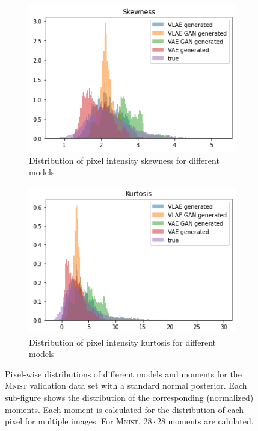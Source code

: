 \begin{figure}
    \hfill
    \begin{subfigure}{0.48\textwidth}
        \centering
        \includegraphics[width=\textwidth]{images/generated_vs_true/mnist/mnist_vs_models_skew_gauss_post.png}
        \caption{Distribution of pixel intensity skewness for different models}
        \label{subfig:skew_generated_vs_true_gauss_post}
    \end{subfigure}
    \hfill
    \begin{subfigure}{0.48\textwidth}
        \centering
        \includegraphics[width=\textwidth]{images/generated_vs_true/mnist/mnist_vs_models_kurt_gauss_post.png}
        \caption{Distribution of pixel intensity kurtosis for different models}
        \label{subfig:kurt_generated_vs_true_gauss_post}
    \end{subfigure}
    \caption[Models on \textsc{Mnist}: Pixel-wise distributions - Gaussian Posterior]{Pixel-wise distributions of different models and moments for the \textsc{Mnist} validation data set with a standard normal posterior.
    Each sub-figure shows the distribution of the corresponding (normalized) moments. Each moment is calculated for the distribution of each pixel for multiple images.
    For \textsc{Mnist}, $28\cdot 28$ moments are calulated.}
    \label{fig:mean_generated_vs_true_gauss_post}
\end{figure}


